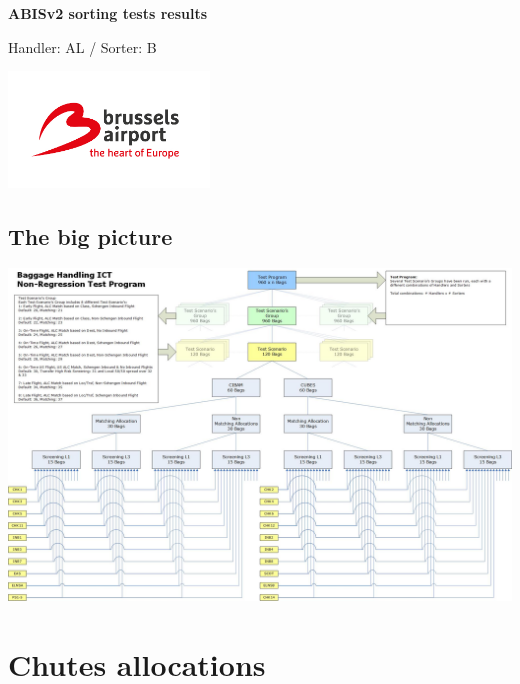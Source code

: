 \documentclass{report}
\begin{document}
\begin{titlepage}
    \begin{center}
        \vspace*{1cm}
            
        \Huge
        \textbf{ABISv2 sorting tests results}
            
        \vspace{0.5cm}
        \LARGE
        Handler: AL / Sorter: B
        
        
        \includegraphics[width=0.4\textwidth]{BAC1}
        \Large            
    \end{center}
\end{titlepage}
\tableofcontents
\begin{landscape}
\chapter*{The big picture}
\begin{center}
\includegraphics[width=1.1\textwidth]{visio}
\end{center}
\end{landscape}
\chapter*{Chutes allocations}
\end{document}
